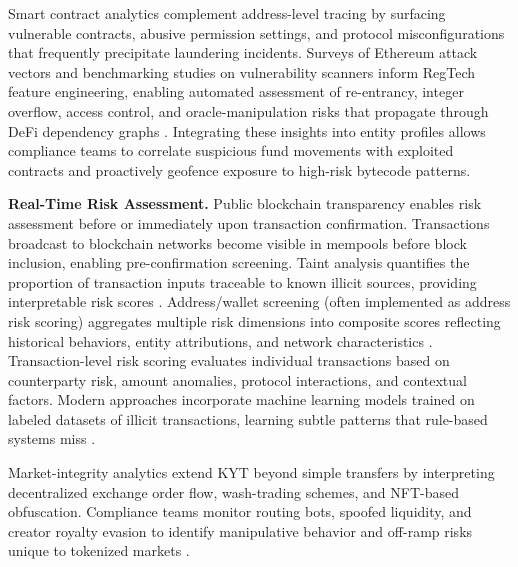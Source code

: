 \documentclass[conference,compsoc]{IEEEtran}
\begin{document}
Smart contract analytics complement address-level tracing by surfacing vulnerable contracts, abusive permission settings, and protocol misconfigurations that frequently precipitate laundering incidents. Surveys of Ethereum attack vectors and benchmarking studies on vulnerability scanners inform RegTech feature engineering, enabling automated assessment of re-entrancy, integer overflow, access control, and oracle-manipulation risks that propagate through DeFi dependency graphs \cite{atzei2017surveyattacksethereum,baets2024vulnerabilitydetectionsmart}. Integrating these insights into entity profiles allows compliance teams to correlate suspicious fund movements with exploited contracts and proactively geofence exposure to high-risk bytecode patterns.

\noindent\textbf{Real-Time Risk Assessment.}
Public blockchain transparency enables risk assessment before or immediately upon transaction confirmation. Transactions broadcast to blockchain networks become visible in mempools before block inclusion, enabling pre-confirmation screening. Taint analysis quantifies the proportion of transaction inputs traceable to known illicit sources, providing interpretable risk scores \cite{moser2013inquirymoneylaundering,moser2014riskscoringbitcoin}. Address/wallet screening (often implemented as address risk scoring) aggregates multiple risk dimensions into composite scores reflecting historical behaviors, entity attributions, and network characteristics \cite{weber2019antimoneylaunderingbitcoin,pocher2023detectinganomalouscryptocurrency}. Transaction-level risk scoring evaluates individual transactions based on counterparty risk, amount anomalies, protocol interactions, and contextual factors. Modern approaches incorporate machine learning models trained on labeled datasets of illicit transactions, learning subtle patterns that rule-based systems miss \cite{alarab2020comparativeanalysisusing,lorenz2020machinelearningmethods,alotibi2022moneylaunderingdetection}.

Market-integrity analytics extend KYT beyond simple transfers by interpreting decentralized exchange order flow, wash-trading schemes, and NFT-based obfuscation. Compliance teams monitor routing bots, spoofed liquidity, and creator royalty evasion to identify manipulative behavior and off-ramp risks unique to tokenized markets \cite{victor2021detectingquantifyingwash,wang2021nonfungibletokennft}.
\end{document}
